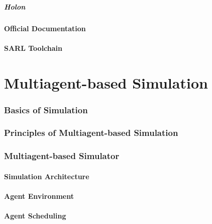 \begin{bibliographysection}
	\subsubsection{Holon}
	
	\subsection{Official Documentation}
	
	\subsection{SARL Toolchain}
	

\end{bibliographysection}

\part{Multiagent-based Simulation}
\begin{bibliographysection}

	\section[Simulation Basics]{Basics of Simulation}
	

	\section[MABS Principles]{Principles of Multiagent-based Simulation}
	
	\section[MABS Simulator]{Multiagent-based Simulator}
	\subsection{Simulation Architecture}
	
	\subsection{Agent Environment}
	
	\subsection{Agent Scheduling}
	

	\thanksslide
\end{bibliographysection}

